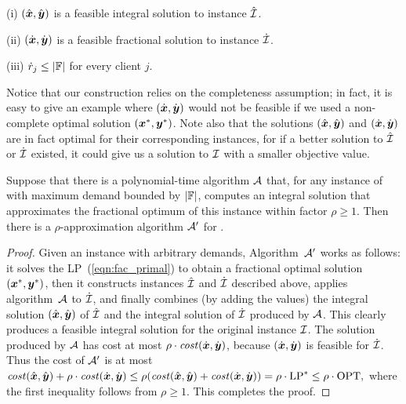 \documentclass[11pt]{article}
\begin{document}

\begin{lemma}\label{lem: polynomial demands partition}
{\rm (i)}
  $(\hat{\boldsymbol{x}}, \hat{\boldsymbol{y}})$ is a feasible integral solution to
  instance ${\hat{\cal I}}$.

\noindent
{\rm (ii)}
  $(\dot{\boldsymbol{x}}, \dot{\boldsymbol{y}})$ is a feasible fractional
  solution to instance ${\dot{\cal I}}$.

\noindent
{\rm (iii)}
${\dot r}_j\leq |\mathbb{F}|$ for every client $j$.

\end{lemma}

Notice that our construction relies on the completeness assumption; in
fact, it is easy to give an example where $(\dot{\boldsymbol{x}}, \dot{\boldsymbol{y}})$ would
not be feasible if we used a non-complete optimal solution
$(\boldsymbol{x}^\ast,\boldsymbol{y}^\ast)$.  Note also that the solutions
$(\hat{\boldsymbol{x}},\hat{\boldsymbol{y}})$ and $(\dot{\boldsymbol{x}}, \dot{\boldsymbol{y}})$ are in fact optimal for
their corresponding instances, for if a better solution to ${\hat{\cal I}}$
or ${\dot{\cal I}}$ existed, it could give us a solution to $\mathcal{I}$ with a
smaller objective value.


\begin{theorem}\label{thm: reduction to polynomial}
  Suppose that there is a polynomial-time algorithm ${\cal A}$
  that, for any instance of {\FTFP} with maximum demand
  bounded by $|\mathbb{F}|$, computes an integral solution
  that approximates the fractional optimum of this instance
  within factor $\rho\geq 1$.  Then there is a
  $\rho$-approximation algorithm ${\cal A}'$ for {\FTFP}.
\end{theorem}


\begin{proof}
  Given an {\FTFP} instance with arbitrary demands, Algorithm~${\cal A}'$ works
as follows: it solves the LP~(\ref{eqn:fac_primal}) to obtain a
  fractional optimal solution $(\boldsymbol{x}^\ast,\boldsymbol{y}^\ast)$, then it constructs
  instances ${\hat{\cal I}}$ and ${\dot{\cal I}}$ described above,  applies
  algorithm~${\cal A}$ to ${\dot{\cal I}}$, and finally combines (by adding
  the values) the integral solution $(\hat{\boldsymbol{x}}, \hat{\boldsymbol{y}})$ of
  ${\hat{\cal I}}$ and the integral solution of ${\dot{\cal I}}$ produced
  by ${\cal A}$. This clearly produces a feasible integral
  solution for the original instance $\mathcal{I}$.
The solution produced by ${\cal A}$ has cost at most
$\rho\cdot{\it cost}(\dot{\boldsymbol{x}},\dot{\boldsymbol{y}})$, because $(\dot{\boldsymbol{x}},\dot{\boldsymbol{y}})$
is feasible for ${\dot{\cal I}}$. Thus the cost of ${\cal A}'$ is at most
% 
$
 {\it cost}(\hat{\boldsymbol{x}}, \hat{\boldsymbol{y}}) + \rho\cdot{\it cost}(\dot{\boldsymbol{x}},\dot{\boldsymbol{y}})
	\le
 \rho({\it cost}(\hat{\boldsymbol{x}}, \hat{\boldsymbol{y}}) + {\it cost}(\dot{\boldsymbol{x}},\dot{\boldsymbol{y}}))
		= \rho\cdot\mbox{\rm LP}^\ast \le \rho\cdot\mbox{\rm OPT},
$
%
where the first inequality follows from $\rho\geq 1$. This completes
the proof.
\end{proof}
\end{document}
